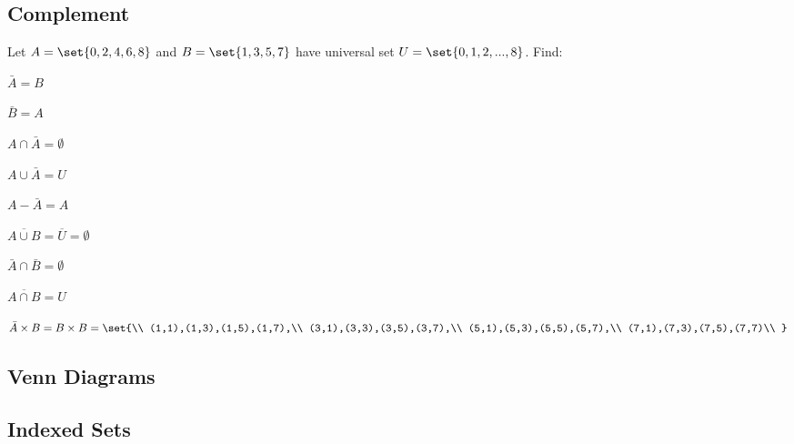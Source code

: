 \documentclass[DIN, pagenumber=false, fontsize=11pt, parskip=half]{scrartcl}
\begin{document}
\subsection{Complement}

\begin{problems}
    \problem Let $A = \set{0,2,4,6,8}$ and $B = \set{1,3,5,7}$ have universal set $U = \set{0,1,2,...,8}$. Find:
    \begin{parts}
        \item $\bar{A} = B$
        \item $\bar{B} = A$
        \item $A \cap \bar{A} = \emptyset$
        \item $A \cup \bar{A} = U$
        \item $A - \bar{A} = A$
        \item $\overline{A \cup B} = \overline{U} = \emptyset$
        \item $\bar{A} \cap \bar{B} = \emptyset$
        \item $\overline{A \cap B} = U$
        \item $\bar{A} \times B = B \times B = \set{\\
                (1,1),(1,3),(1,5),(1,7),\\
                (3,1),(3,3),(3,5),(3,7),\\
                (5,1),(5,3),(5,5),(5,7),\\
                (7,1),(7,3),(7,5),(7,7)\\
            }$
    \end{parts}
\end{problems}

\subsection{Venn Diagrams}


\subsection{Indexed Sets}
\end{document}
